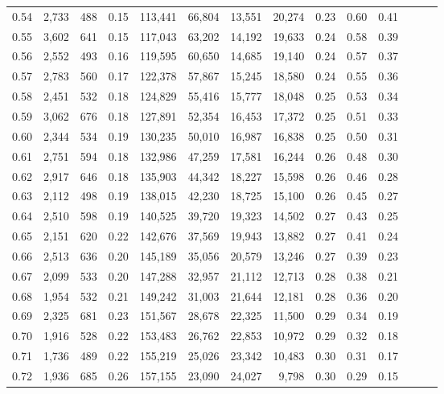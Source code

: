 \begin{tabular}{rrrrrrrrrrrrrr}
0.54 &  2,733 &  488 &  0.15 &  113,441 &   66,804 &  13,551 &  20,274 &  0.23 &  0.60 &      0.41 \\
0.55 &  3,602 &  641 &  0.15 &  117,043 &   63,202 &  14,192 &  19,633 &  0.24 &  0.58 &      0.39 \\
0.56 &  2,552 &  493 &  0.16 &  119,595 &   60,650 &  14,685 &  19,140 &  0.24 &  0.57 &      0.37 \\
0.57 &  2,783 &  560 &  0.17 &  122,378 &   57,867 &  15,245 &  18,580 &  0.24 &  0.55 &      0.36 \\
0.58 &  2,451 &  532 &  0.18 &  124,829 &   55,416 &  15,777 &  18,048 &  0.25 &  0.53 &      0.34 \\
0.59 &  3,062 &  676 &  0.18 &  127,891 &   52,354 &  16,453 &  17,372 &  0.25 &  0.51 &      0.33 \\
0.60 &  2,344 &  534 &  0.19 &  130,235 &   50,010 &  16,987 &  16,838 &  0.25 &  0.50 &      0.31 \\
0.61 &  2,751 &  594 &  0.18 &  132,986 &   47,259 &  17,581 &  16,244 &  0.26 &  0.48 &      0.30 \\
0.62 &  2,917 &  646 &  0.18 &  135,903 &   44,342 &  18,227 &  15,598 &  0.26 &  0.46 &      0.28 \\
0.63 &  2,112 &  498 &  0.19 &  138,015 &   42,230 &  18,725 &  15,100 &  0.26 &  0.45 &      0.27 \\
0.64 &  2,510 &  598 &  0.19 &  140,525 &   39,720 &  19,323 &  14,502 &  0.27 &  0.43 &      0.25 \\
0.65 &  2,151 &  620 &  0.22 &  142,676 &   37,569 &  19,943 &  13,882 &  0.27 &  0.41 &      0.24 \\
0.66 &  2,513 &  636 &  0.20 &  145,189 &   35,056 &  20,579 &  13,246 &  0.27 &  0.39 &      0.23 \\
0.67 &  2,099 &  533 &  0.20 &  147,288 &   32,957 &  21,112 &  12,713 &  0.28 &  0.38 &      0.21 \\
0.68 &  1,954 &  532 &  0.21 &  149,242 &   31,003 &  21,644 &  12,181 &  0.28 &  0.36 &      0.20 \\
0.69 &  2,325 &  681 &  0.23 &  151,567 &   28,678 &  22,325 &  11,500 &  0.29 &  0.34 &      0.19 \\
0.70 &  1,916 &  528 &  0.22 &  153,483 &   26,762 &  22,853 &  10,972 &  0.29 &  0.32 &      0.18 \\
0.71 &  1,736 &  489 &  0.22 &  155,219 &   25,026 &  23,342 &  10,483 &  0.30 &  0.31 &      0.17 \\
0.72 &  1,936 &  685 &  0.26 &  157,155 &   23,090 &  24,027 &   9,798 &  0.30 &  0.29 &      0.15 \\

\end{tabular}
